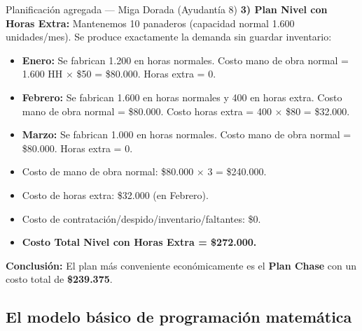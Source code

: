 \begin{ejercicio}{Planificación agregada --- Miga Dorada (Ayudantía 8)}
\textbf{3) Plan Nivel con Horas Extra:}
Mantenemos 10 panaderos (capacidad normal 1.600 unidades/mes). Se produce exactamente la demanda sin guardar inventario:
\begin{itemize}
  \item \textbf{Enero:} Se fabrican 1.200 en horas normales. Costo mano de obra normal = 1.600 HH $\times$ \$50 = \$80.000. Horas extra = 0.
  \item \textbf{Febrero:} Se fabrican 1.600 en horas normales y 400 en horas extra. Costo mano de obra normal = \$80.000. Costo horas extra = 400 $\times$ \$80 = \$32.000.
  \item \textbf{Marzo:} Se fabrican 1.000 en horas normales. Costo mano de obra normal = \$80.000. Horas extra = 0.
\end{itemize}
\begin{itemize}
  \item Costo de mano de obra normal: \$80.000 $\times$ 3 = \$240.000.  
  \item Costo de horas extra: \$32.000 (en Febrero).  
  \item Costo de contratación/despido/inventario/faltantes: \$0.  
  \item \textbf{Costo Total Nivel con Horas Extra = \$272.000.}
\end{itemize}

\textbf{Conclusión:} El plan más conveniente económicamente es el \textbf{Plan Chase} con un costo total de \textbf{\$239.375}.
\end{ejercicio}

\subsection{El modelo básico de programación matemática}

